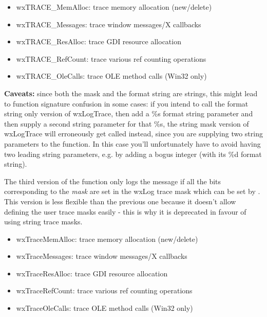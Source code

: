 \begin{itemize}\itemsep=0pt
\item wxTRACE\_MemAlloc: trace memory allocation (new/delete)
\item wxTRACE\_Messages: trace window messages/X callbacks
\item wxTRACE\_ResAlloc: trace GDI resource allocation
\item wxTRACE\_RefCount: trace various ref counting operations
\item wxTRACE\_OleCalls: trace OLE method calls (Win32 only)
\end{itemize}

{\bf Caveats:} since both the mask and the format string are strings,
this might lead to function signature confusion in some cases:
if you intend to call the format string only version of wxLogTrace,
then add a \%s format string parameter and then supply a second string parameter for that \%s, the string mask version of wxLogTrace will erroneously get called instead, since you are supplying two string parameters to the function.
In this case you'll unfortunately have to avoid having two leading
string parameters, e.g. by adding a bogus integer (with its \%d format string). 

The third version of the function only logs the message if all the bits
corresponding to the {\it mask} are set in the wxLog trace mask which can be
set by . This version is less
flexible than the previous one because it doesn't allow defining the user
trace masks easily - this is why it is deprecated in favour of using string
trace masks.

\begin{itemize}\itemsep=0pt
\item wxTraceMemAlloc: trace memory allocation (new/delete)
\item wxTraceMessages: trace window messages/X callbacks
\item wxTraceResAlloc: trace GDI resource allocation
\item wxTraceRefCount: trace various ref counting operations
\item wxTraceOleCalls: trace OLE method calls (Win32 only)
\end{itemize}


\label{wxsafeshowmessage}



